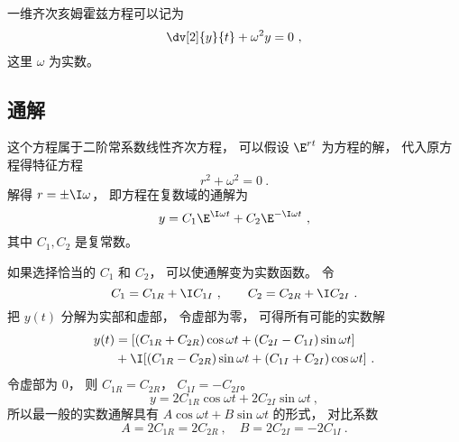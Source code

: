 
\begin{issues}
\issueNeedCite
\end{issues}


一维齐次亥姆霍兹方程可以记为
\begin{equation}
\dv[2]{y}{t} + \omega^2 y = 0~,
\end{equation}
这里 $\omega$ 为实数。

\subsection{通解}
这个方程属于二阶常系数线性齐次方程， 可以假设 $\E^{rt}$ 为方程的解， 代入原方程得特征方程
\begin{equation}
r^2 + \omega^2 = 0~.
\end{equation}
解得 $r = \pm \I \omega$， 即方程在复数域的通解为
\begin{equation}
y = C_1 \E^{\I\omega t} + C_2 \E^{-\I\omega t}~,
\end{equation}
其中 $C_1, C_2$ 是复常数。

如果选择恰当的 $C_1$ 和 $C_2$， 可以使通解变为实数函数。 令
\begin{equation}
C_1 = C_{1R} + \I C_{1I}~, \qquad
C_2 = C_{2R} + \I C_{2I}~.
\end{equation}
把 $y(t)$ 分解为实部和虚部， 令虚部为零， 可得所有可能的实数解
\begin{equation}\label{eq_HmhzEq_1}
\begin{aligned}
y(t) &= [(C_{1R} + C_{2R}) \cos\omega t + (C_{2I} - C_{1I}) \sin\omega t] \\
& + \I [(C_{1R} - C_{2R}) \sin \omega t + (C_{1I} + C_{2I}) \cos \omega t]~.
\end{aligned}
\end{equation}
令虚部为 $0$， 则 $C_{1R} = C_{2R}$， $C_{1I} = -C_{2I}$。
\begin{equation}
y = 2C_{1R}\cos\omega t + 2C_{2I}\sin\omega t~,
\end{equation}
所以最一般的实数通解具有 $A\cos\omega t + B\sin\omega t$ 的形式， 对比系数
\begin{equation}
A = 2C_{1R} = 2C_{2R}~,\quad B = 2C_{2I} = -2C_{1I}~.
\end{equation}
